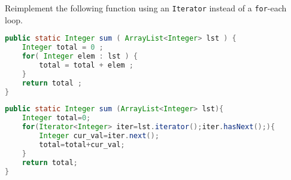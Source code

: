 Reimplement the following function using an \texttt{Iterator} instead of a \texttt{for}-each loop.
\begin{lstlisting}[language=java]
public static Integer sum ( ArrayList<Integer> lst ) {
	Integer total = 0 ;
	for( Integer elem : lst ) {
		total = total + elem ;
	}
	return total ;
}
\end{lstlisting}
\begin{answer}
\begin{lstlisting}[language=java]
public static Integer sum (ArrayList<Integer> lst){
	Integer total=0;
	for(Iterator<Integer> iter=lst.iterator();iter.hasNext();){
		Integer cur_val=iter.next(); 
		total=total+cur_val;
	}
	return total;
}
\end{lstlisting}
\end{answer}


\vspace{24pt}